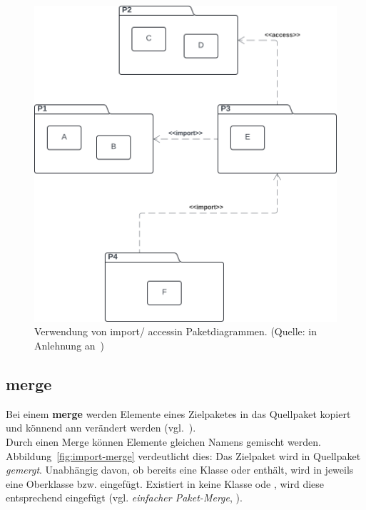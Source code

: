 \begin{figure}
    \centering
    \includegraphics[scale=0.4]{part three/Klassendiagramme - Erweiterte Konzepte und Paketdiagramme/img/import-access}
    \caption{Verwendung von \guillemotleft import\guillemotright / \guillemotleft access\guillemotright in Paketdiagrammen. (Quelle: in Anlehnung an~\cite[308, Abb. 6.8-3]{Bal05})}
    \label{fig:import-access}
\end{figure}

\subsection{\guillemotleft merge\guillemotright}
Bei einem \textbf{merge} werden Elemente eines Zielpaketes in das Quellpaket kopiert und könnend ann verändert werden (vgl.~\cite[307]{Bal05}).\\
Durch einen Merge können Elemente gleichen Namens gemischt werden.
Abbildung~\ref{fig:import-merge} verdeutlicht dies: Das Zielpaket  wird in Quellpaket  \textit{gemergt}.
Unabhängig davon, ob  bereits eine Klasse  oder  enthält, wird in  jeweils eine Oberklasse  bzw.  eingefügt.
Existiert in  keine Klasse  ode , wird diese entsprechend eingefügt (vgl. \textit{einfacher Paket-Merge}, \cite[308]{Bal05}).


